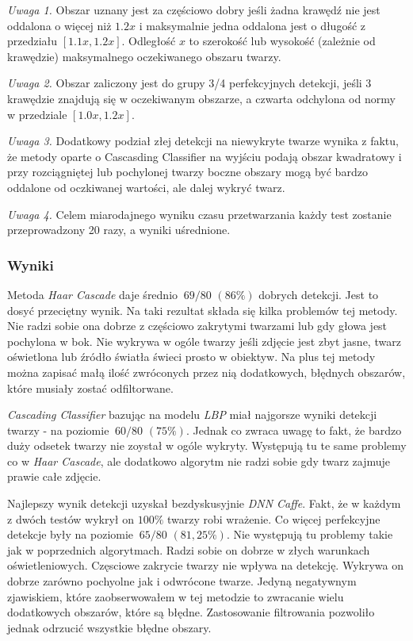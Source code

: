 \documentclass[10pt, a4paper]{article}
\begin{document}
\textit{Uwaga 1.} Obszar uznany jest za częściowo dobry jeśli żadna krawędź nie jest oddalona o więcej niż $1.2 x$ i maksymalnie jedna oddalona jest o długość z przedziału $[1.1x, 1.2x]$. Odległość $x$ to szerokość lub wysokość (zależnie od krawędzie) maksymalnego oczekiwanego obszaru twarzy.
\par
\textit{Uwaga 2.} Obszar zaliczony jest do grupy 3/4 perfekcyjnych detekcji, jeśli 3 krawędzie znajdują się w oczekiwanym obszarze, a czwarta odchylona od normy w przedziale $[1.0x, 1.2x]$.
\par 
\textit{Uwaga 3.} Dodatkowy podział złej detekcji na niewykryte twarze wynika z faktu, że metody oparte o Cascasding Classifier na wyjściu podają obszar kwadratowy i przy rozciągniętej lub pochylonej twarzy boczne obszary mogą być bardzo oddalone od oczkiwanej wartości, ale dalej wykryć twarz. 
\par
\textit{Uwaga 4.} Celem miarodajnego wyniku czasu przetwarzania każdy test zostanie przeprowadzony 20 razy, a wyniki uśrednione.

\subsubsection{Wyniki}
\label{section:face_main_test}






Metoda \textit{Haar Cascade} daje średnio $~69/80$ $(86\%)$ dobrych detekcji. Jest to dosyć przeciętny wynik. Na taki rezultat składa się kilka problemów tej metody. Nie radzi sobie ona dobrze z częściowo zakrytymi twarzami lub gdy głowa jest pochylona w bok. Nie wykrywa w ogóle twarzy jeśli zdjęcie jest zbyt jasne, twarz oświetlona lub źródło światła świeci prosto w obiektyw. Na plus tej metody można zapisać małą ilość zwróconych przez nią dodatkowych, błędnych obszarów, które musiały zostać odfiltorwane.

\par
\textit{Cascading Classifier} bazując na modelu \textit{LBP} miał najgorsze wyniki detekcji twarzy - na poziomie $~60/80$ $(75 \%)$. Jednak co zwraca uwagę to fakt, że bardzo duży odsetek twarzy nie zoystał w ogóle wykryty. Występują tu te same problemy co w \textit{Haar Cascade}, ale dodatkowo algorytm nie radzi sobie gdy twarz zajmuje prawie całe zdjęcie.

\par
Najlepszy wynik detekcji uzyskał bezdyskusyjnie \textit{DNN Caffe}. Fakt, że w każdym z dwóch testów wykrył on $100 \%$ twarzy robi wrażenie. Co więcej perfekcyjne detekcje były na poziomie $~65/80$ $(81,25 \%)$. Nie występują tu problemy takie jak w poprzednich algorytmach. Radzi sobie on dobrze w złych warunkach oświetleniowych. Częsciowe zakrycie twarzy nie wpływa na detekcję. Wykrywa on dobrze zarówno pochyolne jak i odwrócone twarze. Jedyną negatywnym zjawiskiem, które zaobserwowałem w tej metodzie to zwracanie wielu dodatkowych obszarów, które są błędne. Zastosowanie filtrowania pozwoliło jednak odrzucić wszystkie błędne obszary.
\end{document}
